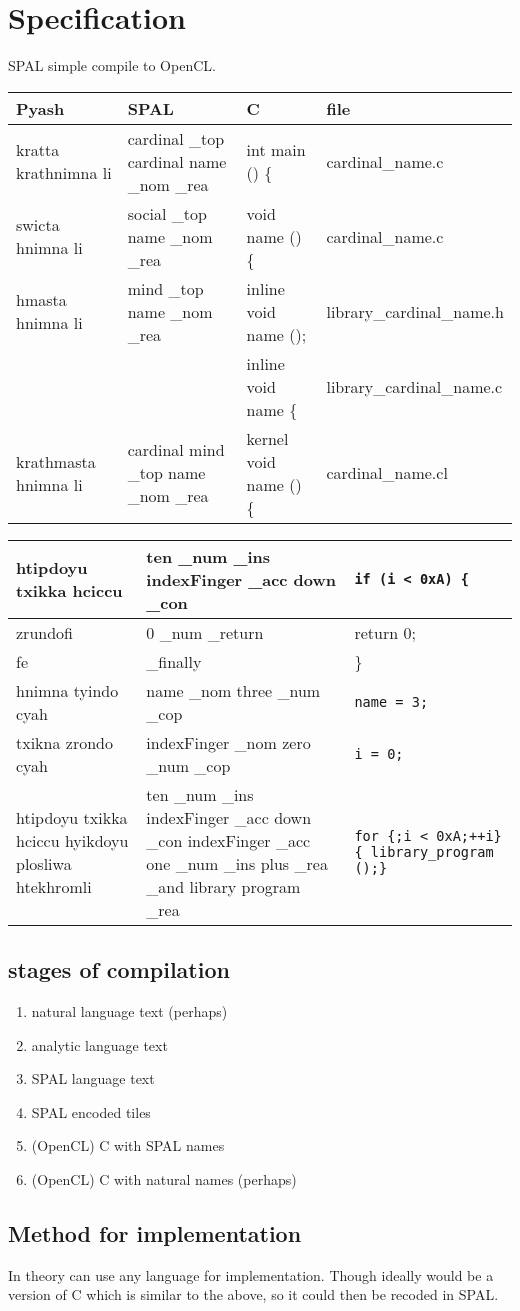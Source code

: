 \chapter{Specification}
SPAL simple compile to OpenCL.\@

\begin{sidewaystable}
\begin{tabulary}{\textwidth}{L|L|L|L}
Pyash & SPAL & C & file \\
\midrule 
\midrule 
kratta krathnimna li &
cardinal  \_top cardinal name \_nom \_rea & int main () \{ & 
cardinal\_name.c \\
\midrule
swicta hnimna li &
social \_top name \_nom \_rea & void name () \{ & cardinal\_name.c \\
\midrule
hmasta hnimna li&
mind \_top name \_nom \_rea & inline void name (); &
library\_cardinal\_name.h \\
& & inline void name\(\) \{ & library\_cardinal\_name.c \\
\midrule
krathmasta hnimna li &
cardinal mind \_top name \_nom \_rea & kernel void name () \{ &
cardinal\_name.cl \\
\end{tabulary}
\begin{tabulary}{\textwidth}{L|L|L}
\toprule
htipdoyu txikka hciccu &
ten \_num \_ins indexFinger \_acc down \_con & \texttt{if (i < 0xA) \{} \\
\midrule 
zrundofi  & 
0 \_num \_return & return 0; \\
\midrule
fe & 
\_finally & \} \\
\midrule
hnimna tyindo cyah &
name \_nom three \_num \_cop & \texttt{name = 3;} \\
\midrule 
txikna zrondo cyah &
indexFinger \_nom zero \_num \_cop & \texttt{i = 0;} \\
\midrule 
htipdoyu txikka hciccu hyikdoyu plosliwa htekhromli&
ten \_num \_ins indexFinger \_acc down \_con 
indexFinger \_acc one \_num \_ins plus \_rea \_and library program \_rea & 
\texttt{for \{;i < 0xA;\@ ++i\}\{ library\_program ();\}}  \\
\end{tabulary}
\end{sidewaystable}


\section{stages of compilation}

\begin{enumerate}
  \item natural language text (perhaps)
  \item analytic language text
  \item SPAL language text
  \item SPAL encoded tiles
  \item (OpenCL) C with SPAL names
  \item (OpenCL) C with natural names (perhaps)
\end{enumerate}

\section{Method for implementation}
In theory can use any language for implementation.  
Though ideally would be a version of C which is similar to the above, 
so it could then be recoded in SPAL.\@


